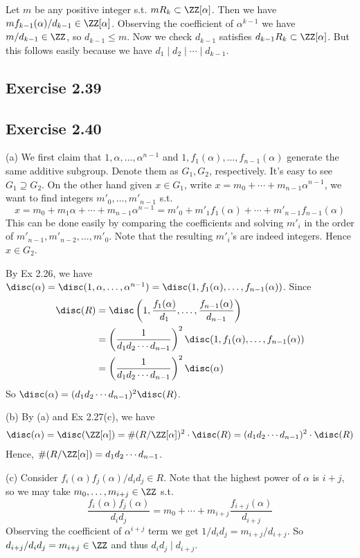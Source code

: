 \documentclass[../Chapter.tex]{subfiles}
\begin{document}
Let $m$ be any positive integer s.t. $mR_k\subset\ZZ[\alpha]$. Then we have $mf_{k-1}(\alpha)/d_{k-1}\in\ZZ[\alpha]$. Observing the coefficient of $\alpha^{k-1}$ we have $m/d_{k-1}\in\ZZ$, so $d_{k-1}\leq m$. Now we check $d_{k-1}$ satisfies $d_{k-1}R_k\subset \ZZ[\alpha]$. But this follows easily because we have $d_1\mid d_2\mid\cdots\mid d_{k-1}$.

\subsection*{Exercise 2.39}

\subsection*{Exercise 2.40}

(a) We first claim that $1,\alpha,\ldots,\alpha^{n-1}$ and $1,f_1(\alpha),\ldots,f_{n-1}(\alpha)$ generate the same additive subgroup. Denote them as $G_1,G_2$, respectively. It's easy to see $G_1\supseteq G_2$. On the other hand given $x\in G_1$, write $x=m_0+\cdots+m_{n-1}\alpha^{n-1}$, we want to find integers $m'_0,\ldots,m'_{n-1}$ s.t. $$x=m_0+m_1\alpha+\cdots+m_{n-1}\alpha^{n-1}=m'_0+m'_1f_1(\alpha)+\cdots+m'_{n-1}f_{n-1}(\alpha)$$ This can be done easily by comparing the coefficients and solving $m'_i$ in the order of $m'_{n-1},m'_{n-2},\ldots,m'_0$. Note that the resulting $m'_i$'s are indeed integers. Hence $x\in G_2$.

By Ex 2.26, we have $\disc(\alpha)=\disc(1,\alpha,\ldots,\alpha^{n-1})=\disc(1,f_1(\alpha),\ldots,f_{n-1}(\alpha))$. Since 
\begin{align*}
\disc(R) &= \disc\left(1,\frac{f_1(\alpha)}{d_1},\ldots,\frac{f_{n-1}(\alpha)}{d_{n-1}}\right) \\
&= \left(\frac{1}{d_1d_2\cdots d_{n-1}}\right)^2\disc(1,f_1(\alpha),\ldots,f_{n-1}(\alpha)) \\ 
&= \left(\frac{1}{d_1d_2\cdots d_{n-1}}\right)^2\disc(\alpha)
\end{align*}
So $\disc(\alpha)=(d_1d_2\cdots d_{n-1})^2\disc(R)$.

(b) By (a) and Ex 2.27(c), we have
\begin{align*}
\disc(\alpha)=\disc(\ZZ[\alpha])=\#(R/\ZZ[\alpha])^2\cdot\disc(R)=(d_1d_2\cdots d_{n-1})^2\cdot\disc(R)
\end{align*}
Hence, $\#(R/\ZZ[\alpha])=d_1d_2\cdots d_{n-1}$.

(c) Consider $f_i(\alpha)f_j(\alpha)/d_id_j\in R$. Note that the highest power of $\alpha$ is $i+j$, so we may take $m_0,\ldots,m_{i+j}\in\ZZ$ s.t. $$\frac{f_i(\alpha)f_j(\alpha)}{d_id_j}=m_0+\cdots+m_{i+j}\frac{f_{i+j}(\alpha)}{d_{i+j}}$$ Observing the coefficient of $\alpha^{i+j}$ term we get $1/d_id_j=m_{i+j}/d_{i+j}$. So $d_{i+j}/d_id_j=m_{i+j}\in\ZZ$ and thus $d_id_j\mid d_{i+j}$.
\end{document}
